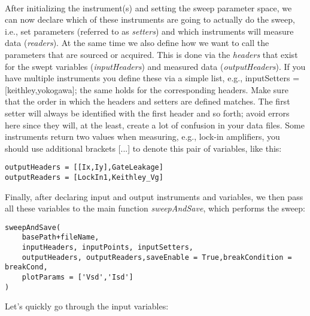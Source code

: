\\
After initializing the instrument(s) and setting the sweep parameter space, we can now declare which of these instruments are going to actually do the sweep, i.e., set parameters (referred to as \textit{setters}) and which instruments will measure data (\textit{readers}). At the same time we also define how we want to call the parameters that are sourced or acquired. This is done via the \textit{headers} that exist for the swept variables (\textit{inputHeaders}) and measured data (\textit{outputHeaders}). If you have multiple instruments you define these via a simple list, e.g., inputSetters = [keithley,yokogawa]; the same holds for the corresponding headers. Make sure that the order in which the headers and setters are defined matches. The first setter will always be identified with the first header and so forth; avoid errors here since they will, at the least, create a lot of confusion in your data files. Some instruments return two values when measuring, e.g., lock-in amplifiers, you should use additional brackets [...] to denote this pair of variables, like this:\\

\begin{verbatim}
outputHeaders = [[Ix,Iy],GateLeakage]
outputReaders = [LockIn1,Keithley_Vg]
\end{verbatim}

Finally, after declaring input and output instruments and variables, we then pass all these variables to the main function \textit{sweepAndSave}, which performs the sweep:\\

\begin{verbatim}
sweepAndSave(
    basePath+fileName,
    inputHeaders, inputPoints, inputSetters,
    outputHeaders, outputReaders,saveEnable = True,breakCondition = breakCond,
    plotParams = ['Vsd','Isd']
)
\end{verbatim}

Let's quickly go through the input variables:\\

